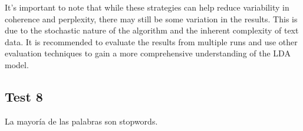 \documentclass[10pt]{article} %
\begin{document}
	It's important to note that while these strategies can help reduce variability in coherence and perplexity, there may still be some variation in the results. This is due to the stochastic nature of the algorithm and the inherent complexity of text data. It is recommended to evaluate the results from multiple runs and use other evaluation techniques to gain a more comprehensive understanding of the LDA model.
	
	\subsection{Test 8}
	La mayor\'ia de las palabras son stopwords.
	
\end{document}
